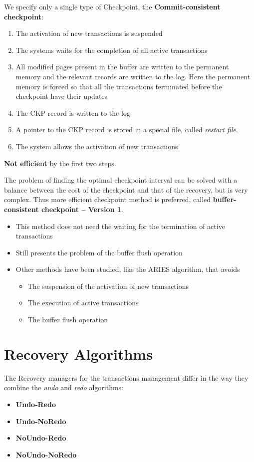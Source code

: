 We specify only a single type of Checkpoint, the \textbf{Commit-consistent checkpoint}:
\begin{enumerate}
    \item The activation of new transactions is suspended
    \item The systems waits for the completion of all active transactions
    \item All modified pages present in the buffer are written to the permanent memory and the relevant records are written to the log. Here the permanent memory is forced so that all the transactions terminated before the checkpoint have their updates
    \item The CKP record is written to the log
    \item A pointer to the CKP record is stored in a special file, called \textit{restart file}.
    \item The system allows the activation of new transactions
\end{enumerate}
\textbf{Not efficient} by the first two steps.

The problem of finding the optimal checkpoint interval can be solved with a balance between the cost of the checkpoint and that of the recovery, but is very complex. Thus more efficient checkpoint method is preferred, called \textbf{buffer-consistent checkpoint – Version 1}.
\begin{itemize}
    \item This method does not need the waiting for the termination of active transactions
    \item Still presents the problem of the buffer flush operation
    \item Other methods have been studied, like the ARIES algorithm, that avoids
    \begin{itemize}
        \item The suspension of the activation of new transactions
        \item The execution of active transactions
        \item The buffer flush operation
    \end{itemize}
\end{itemize}


\section{Recovery Algorithms}
The Recovery managers for the transactions management differ in the way they combine the \textit{undo} and \textit{redo} algorithms:
\begin{itemize}
    \item \textbf{Undo-Redo}
    \item \textbf{Undo-NoRedo}
    \item \textbf{NoUndo-Redo}
    \item \textbf{NoUndo-NoRedo}
\end{itemize}

